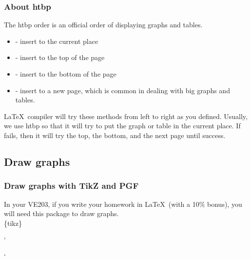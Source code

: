 \begin{frame}
	\frametitle{About htbp}
	The htbp order is an official order of displaying graphs and tables.
	\begin{itemize}
		\item {} - insert to the current place
		\item {} - insert to the top of the page
		\item {} - insert to the bottom of the page
		\item {} - insert to a new page, which is common in dealing with big graphs and tables.
	\end{itemize}
	\LaTeX\ compiler will try these methods from left to right as you defined. Usually, we use htbp so that it will try to put the graph or table in the current place. If fails, then it will try the top, the bottom, and the next page until success.
\end{frame}

\subsection{Draw graphs}

\begin{frame}
	\frametitle{Draw graphs with TikZ and PGF}
	In your VE203, if you write your homework in \LaTeX\ (with a 10\% bonus), you will need this package to draw graphs.\\
	\{tikz\}\\
	\begin{minipage}{0.45\linewidth}
		\begin{example}
			\centering
			
		\end{example}`
	\end{minipage}
	\hfill
	\begin{minipage}{0.5\linewidth}
		
	\end{minipage}
\end{frame}

\begin{frame}
	\begin{minipage}{0.53\linewidth}
		\begin{example}
			\centering
			
		\end{example}`
	\end{minipage}
	\hfill
	\begin{minipage}{0.42\linewidth}
		
	\end{minipage}
\end{frame}